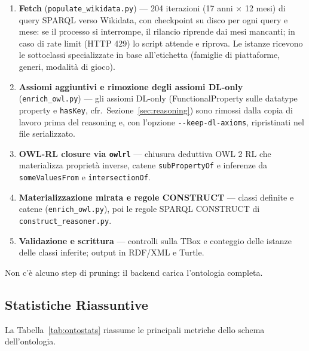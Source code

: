 \begin{enumerate}[nosep]
  \item \textbf{Fetch} (\texttt{populate\_wikidata.py}) --- 204 iterazioni (17 anni $\times$ 12 mesi)
    di query SPARQL verso Wikidata, con checkpoint su disco per ogni query e mese: se il processo
    si interrompe, il rilancio riprende dai mesi mancanti; in caso di rate limit (HTTP 429)
    lo script attende e riprova. Le istanze ricevono le sottoclassi specializzate in base all'etichetta
    (famiglie di piattaforme, generi, modalit\`a di gioco).
  \item \textbf{Assiomi aggiuntivi e rimozione degli assiomi DL-only} (\texttt{enrich\_owl.py}) --- gli assiomi
    DL-only (FunctionalProperty sulle datatype property e \texttt{hasKey}, cfr.\ Sezione~\ref{sec:reasoning})
    sono rimossi dalla copia di lavoro prima del reasoning e, con l'opzione \texttt{-{}-keep-dl-axioms},
    ripristinati nel file serializzato.
  \item \textbf{OWL-RL closure via \texttt{owlrl}} --- chiusura deduttiva OWL 2 RL che materializza
    propriet\`a inverse, catene \texttt{subPropertyOf} e inferenze da \texttt{someValuesFrom} e \texttt{intersectionOf}.
  \item \textbf{Materializzazione mirata e regole CONSTRUCT} --- classi definite e catene
    (\texttt{enrich\_\-owl.py}), poi le regole SPARQL CONSTRUCT di \texttt{construct\_\-reasoner.py}.
  \item \textbf{Validazione e scrittura} --- controlli sulla TBox e conteggio delle istanze delle
    classi inferite; output in RDF/XML e Turtle.
\end{enumerate}

Non c'\`e alcuno step di pruning: il backend carica l'ontologia completa.

\subsection{Statistiche Riassuntive}

La Tabella~\ref{tab:ontostats} riassume le principali metriche dello schema dell'ontologia.

